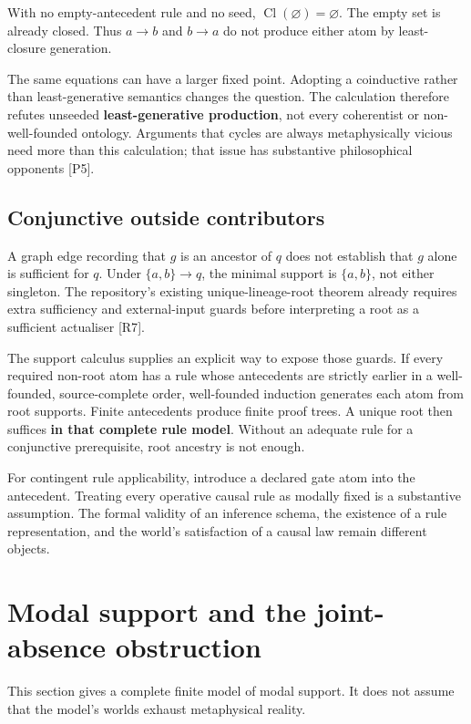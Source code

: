 \documentclass[11pt,a4paper]{article}
\begin{document}
With no empty-antecedent rule and no seed,
\(\operatorname{Cl}(\varnothing)=\varnothing\). The empty set is already
closed. Thus \(a\to b\) and \(b\to a\) do not produce either atom by
least-closure generation.

The same equations can have a larger fixed point. Adopting a coinductive
rather than least-generative semantics changes the question. The
calculation therefore refutes unseeded \textbf{least-generative
production}, not every coherentist or non-well-founded ontology.
Arguments that cycles are always metaphysically vicious need more than
this calculation; that issue has substantive philosophical opponents
{[}P5{]}.

\subsection{Conjunctive outside
contributors}\label{conjunctive-outside-contributors}

A graph edge recording that \(g\) is an ancestor of \(q\) does not
establish that \(g\) alone is sufficient for \(q\). Under
\(\{a,b\}\to q\), the minimal support is \(\{a,b\}\), not either
singleton. The repository's existing unique-lineage-root theorem already
requires extra sufficiency and external-input guards before interpreting
a root as a sufficient actualiser {[}R7{]}.

The support calculus supplies an explicit way to expose those guards. If
every required non-root atom has a rule whose antecedents are strictly
earlier in a well-founded, source-complete order, well-founded induction
generates each atom from root supports. Finite antecedents produce
finite proof trees. A unique root then suffices \textbf{in that complete
rule model}. Without an adequate rule for a conjunctive prerequisite,
root ancestry is not enough.

For contingent rule applicability, introduce a declared gate atom into
the antecedent. Treating every operative causal rule as modally fixed is
a substantive assumption. The formal validity of an inference schema,
the existence of a rule representation, and the world's satisfaction of
a causal law remain different objects.

\section{Modal support and the joint-absence
obstruction}\label{modal-support-and-the-joint-absence-obstruction}

This section gives a complete finite model of modal support. It does not
assume that the model's worlds exhaust metaphysical reality.
\end{document}
